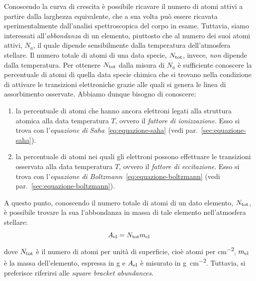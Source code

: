 Conoscendo la curva di crescita è possibile ricavare il numero di atomi attivi a partire dalla larghezza equivalente, che a sua volta può essere ricavata sperimentalmente dall'analisi spettroscopica del corpo in esame. Tuttavia, siamo interessati all'\emph{abbondanza} di un elemento, piuttosto che al numero dei suoi atomi attivi, $N_a$, il quale dipende sensibilmente dalla temperatura dell'atmosfera stellare. Il numero totale di atomi di una data specie, $N_\textup{tot}$, invece, \emph{non} dipende dalla temperatura. Per ottenere $N_\textup{tot}$ dalla misura di $N_a$ è sufficiente conoscere la percentuale di atomi di quella data specie chimica che si trovano nella condizione di attivare le transizioni elettroniche grazie alle quali si genera le linea di assorbimento osservate. Abbiamo dunque bisogno di conoscere:
\begin{enumerate}
    \item la percentuale di atomi che hanno ancora elettroni legati alla struttura atomica alla data temperatura $T$, ovvero il \emph{fattore di ionizzazione}. Esso si trova con l'\emph{equazione di Saha}~\eqref{eq:equazione-saha} (vedi par.~\ref{sec:equazione-saha}).
    \item la percentuale di atomi nei quali gli elettroni possono effettuare le transizioni osservata alla data temperatura $T$, ovvero il \emph{fattore di eccitazione}. Esso si trova con l'\emph{equazione di Boltzmann}~\eqref{eq:equazione-boltzmann} (vedi par.~\ref{sec:equazione-boltzmann}).
\end{enumerate} 

A questo punto, conoscendo il numero totale di atomi di un dato elemento, $N_\textup{tot}$, è possibile trovare la sua l'abbondanza in massa di tale elemento nell'atmosfera stellare:
\begin{equation}\label{eq:abbondanza-in-massa}
    A_\textup{el} = N_\textup{tot} m_\textup{el}
\end{equation}
dove $N_\textup{tot}$ è il numero di atomi per unità di superficie, cioè atomi per \si{cm^{-2}}, $m_\textup{el}$ è la massa dell'elemento, espressa in \si{g} e $A_\textup{el}$ è misurato in \si{g.cm^{-2}}. Tuttavia, si preferisce riferirsi alle \emph{square bracket abundances}.

